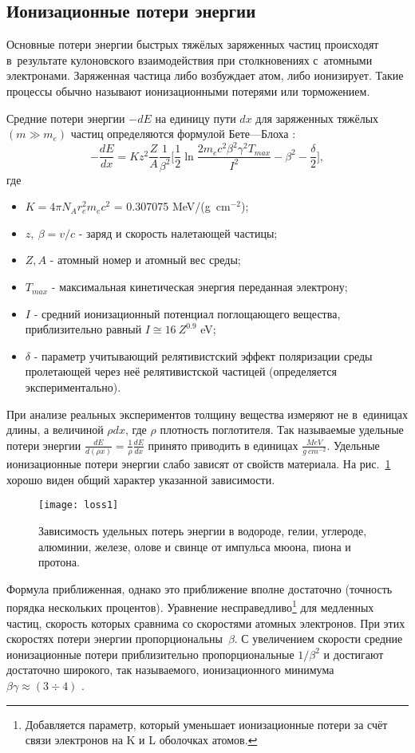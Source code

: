 \subsection{Ионизационные потери энергии}
Основные потери энергии быстрых тяжёлых заряженных частиц происходят 
в~результате кулоновского взаимодействия при столкновениях с~атомными
электронами. Заряженная частица либо возбуждает атом, либо ионизирует.
Такие процессы обычно называют ионизационными потерями или
торможением.

Средние потери энергии $-dE$ на единицу пути $dx$ для заряженных тяжёлых
$(m\gg m_e)$ частиц определяются формулой Бете---Блоха \cite{pdg}:
\[
-\frac{dE}{dx}=Kz^2\frac{Z}{A}\frac{1}{\beta^2}
\Biggl[\frac{1}{2}\ln\frac{2m_ec^2\beta^2\gamma^2T_{max}}{I^2}-\beta^2-\frac{\delta}{2}\Biggr],
\]
где
\begin{itemize}
\item $K=4\pi N_Ar_e^2m_ec^2$ = 0.307075 MeV/(g~cm$^{-2}$);
\item $z,~\beta = v/c$ - заряд и скорость налетающей частицы;
\item $Z, A$ - атомный номер и атомный вес среды;
\item $T_{max}$ - максимальная кинетическая энергия переданная электрону;
\item $I$ - средний ионизационный потенциал поглощающего вещества,
  приблизительно равный $I\cong 16~Z^{0.9}$ eV;
\item $\delta$ - параметр учитывающий релятивистский эффект поляризации
  среды пролетающей через неё релятивистской частицей (определяется
  экспериментально).
\end{itemize}
При анализе реальных экспериментов толщину вещества измеряют не
в~единицах длины, а величиной $\rho dx$, где $\rho$ плотность поглотителя.
Так называемые удельные потери энергии
$\frac{dE}{d(\rho x)}=\frac{1}{\rho}\frac{dE}{dx}$ принято приводить
в единицах $\frac{MeV}{g~cm^{-2}}$. Удельные ионизационные потери энергии
слабо зависят от свойств материала. На рис.~\ref{fig:loss1} хорошо виден
общий характер указанной зависимости.
\begin{figure}[h]\center
  \texttt{[image: loss1]}
  \caption{Зависимость удельных потерь энергии в водороде, гелии,
    углероде, алюминии, железе, олове и свинце от импульса мюона,
    пиона и протона.}
  \label{fig:loss1}
\end{figure}

Формула приближенная, однако это приближение вполне достаточно (точность
порядка нескольких процентов). Уравнение несправедливо\footnote{
Добавляется параметр, который уменьшает ионизационные потери за счёт
связи электронов на K и L оболочках атомов.} для медленных частиц,
скорость которых сравнима со скоростями атомных электронов.
При этих скоростях потери энергии пропорциональны~$\beta$. С увеличением
скорости средние ионизационные потери приблизительно пропорциональные
$1/\beta^2$ и достигают достаточно широкого, так называемого,
ионизационного минимума $\beta\gamma\approx (3 \div 4)$ \cite{cer:04}.

